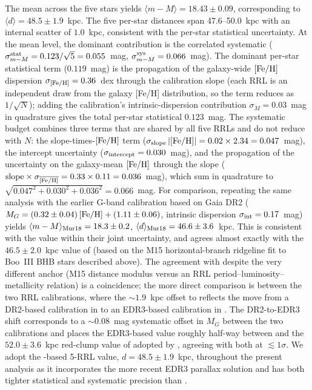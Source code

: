 \documentclass[twocolumn]{aastex631}
\begin{document}
The mean across the five stars yields $\langle m-M \rangle = 18.43 \pm 0.09$, corresponding to $\langle d \rangle = 48.5 \pm 1.9$~kpc.  The five per-star distances span 47.6--50.0~kpc with an internal scatter of $1.0$~kpc, consistent with the per-star statistical uncertainty.  At the mean level, the dominant contribution is the correlated systematic ($\sigma_{m-M}^{\rm stat} = 0.123/\sqrt{5} = 0.055$~mag, $\sigma_{m-M}^{\rm sys} = 0.066$~mag).  The dominant per-star statistical term ($0.119$~mag) is the propagation of the galaxy-wide $[{\rm Fe/H}]$ dispersion $\sigma_{[{\rm Fe/H}]} = 0.36$~dex through the calibration slope (each RRL is an independent draw from the galaxy [Fe/H] distribution, so the term reduces as $1/\sqrt{N}$); adding the calibration's intrinsic-dispersion contribution $\sigma_M = 0.03$~mag in quadrature gives the total per-star statistical $0.123$~mag.  The systematic budget combines three terms that are shared by all five RRLs and do not reduce with $N$: the slope-times-$[{\rm Fe/H}]$ term ($\sigma_{\rm slope}\,|[{\rm Fe/H}]| = 0.02 \times 2.34 = 0.047$~mag), the intercept uncertainty ($\sigma_{\rm intercept} = 0.030$~mag), and the propagation of the uncertainty on the galaxy-mean $[{\rm Fe/H}]$ through the slope (${\rm slope} \times \sigma_{\overline{[{\rm Fe/H}]}} = 0.33 \times 0.11 = 0.036$~mag), which sum in quadrature to $\sqrt{0.047^2 + 0.030^2 + 0.036^2} = 0.066$~mag. For comparison, repeating the same analysis with the earlier \citet{Muraveva2018} G-band calibration based on Gaia DR2 ($M_G = (0.32 \pm 0.04)\,[{\rm Fe/H}] + (1.11 \pm 0.06)$, intrinsic dispersion $\sigma_{\rm int} = 0.17$~mag) yields $\langle m-M \rangle_{\rm Mur18} = 18.3 \pm 0.2$, $\langle d \rangle_{\rm Mur18} = 46.6 \pm 3.6$~kpc. This is consistent with the \citet{Garofalo2022} value within their joint uncertainty, and agrees almost exactly with the $46.5 \pm 2.0$~kpc value of \citet{Carlin2018} (based on the M15 horizontal-branch ridgeline fit to Boo~III BHB stars described above). The agreement with \citet{Carlin2018} despite the very different anchor (M15 distance modulus versus an RRL period--luminosity--metallicity relation) is a coincidence; the more direct comparison is between the two RRL calibrations, where the $\sim 1.9$~kpc offset to \citet{Garofalo2022} reflects the move from a DR2-based calibration in \citet{Muraveva2018} to an EDR3-based calibration in \citet{Garofalo2022}. The DR2-to-EDR3 shift corresponds to a $\sim 0.08$~mag systematic offset in $M_G$ between the two calibrations and places the EDR3-based value roughly half-way between \citet{Carlin2018} and the $52.0 \pm 3.6$~kpc red-clump value of \citet{Correnti2009} adopted by \citet{Moskowitz2020}, agreeing with both at $\lesssim 1\sigma$. We adopt the \citet{Garofalo2022}-based 5-RRL value, $d = 48.5 \pm 1.9$~kpc, throughout the present analysis as it incorporates the more recent EDR3 parallax solution and has both tighter statistical and systematic precision than \citet{Muraveva2018}.
\end{document}
